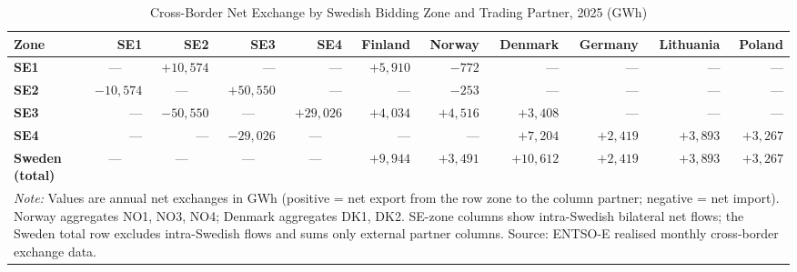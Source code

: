 \begin{table}[htbp]
\centering
\caption{Cross-Border Net Exchange by Swedish Bidding Zone and Trading Partner, 2025 (GWh)}
\label{tab:cross_border_matrix_2025}
\small
\begin{tabular}{lrrrrrrrrrr}
\toprule
\textbf{Zone} & \textbf{SE1} & \textbf{SE2} & \textbf{SE3} & \textbf{SE4} & \textbf{Finland} & \textbf{Norway} & \textbf{Denmark} & \textbf{Germany} & \textbf{Lithuania} & \textbf{Poland} \\
\midrule
\textbf{SE1} & \multicolumn{1}{c}{---} & $+10,574$ & --- & --- & $+5,910$ & $-772$ & --- & --- & --- & --- \\
\textbf{SE2} & $-10,574$ & \multicolumn{1}{c}{---} & $+50,550$ & --- & --- & $-253$ & --- & --- & --- & --- \\
\textbf{SE3} & --- & $-50,550$ & \multicolumn{1}{c}{---} & $+29,026$ & $+4,034$ & $+4,516$ & $+3,408$ & --- & --- & --- \\
\textbf{SE4} & --- & --- & $-29,026$ & \multicolumn{1}{c}{---} & --- & --- & $+7,204$ & $+2,419$ & $+3,893$ & $+3,267$ \\
\midrule
\textbf{Sweden (total)} & \multicolumn{1}{c}{---} & \multicolumn{1}{c}{---} & \multicolumn{1}{c}{---} & \multicolumn{1}{c}{---} & $+9,944$ & $+3,491$ & $+10,612$ & $+2,419$ & $+3,893$ & $+3,267$ \\
\bottomrule
\multicolumn{11}{p{0.99\linewidth}}{\footnotesize
  \textit{Note:} Values are annual net exchanges in GWh (positive = net export
  from the row zone to the column partner; negative = net import).
  Norway aggregates NO1, NO3, NO4; Denmark aggregates DK1, DK2.
  SE-zone columns show intra-Swedish bilateral net flows; the Sweden total row
  excludes intra-Swedish flows and sums only external partner columns.
  Source: ENTSO-E realised monthly cross-border exchange data.}
\end{tabular}
\end{table}
